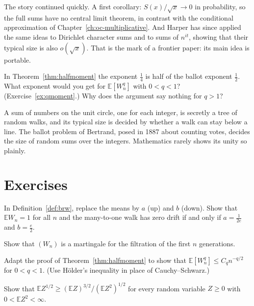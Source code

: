 The story continued quickly. A first corollary: $S(x)/\sqrt x\to0$ in probability, so the full sums have no central limit theorem, in contrast with the conditional approximation of Chapter~\ref{ch:oc-multiplicative}. And Harper has since applied the same ideas to Dirichlet character sums and to sums of $n^{it}$, showing that their typical size is also $o(\sqrt x)$. That is the mark of a frontier paper: its main idea is portable.

\begin{think}
In Theorem~\ref{thm:halfmoment} the exponent $\frac14$ is half of the ballot exponent $\frac12$. What exponent would you get for $\mathbb E[W_n^q]$ with $0<q<1$? (Exercise~\ref{ex:qmoment}.) Why does the argument say nothing for $q>1$?
\end{think}

\begin{beauty}
A sum of numbers on the unit circle, one for each integer, is secretly a tree of random walks, and its typical size is decided by whether a walk can stay below a line. The ballot problem of Bertrand, posed in 1887 about counting votes, decides the size of random sums over the integers. Mathematics rarely shows its unity so plainly.
\end{beauty}

\section{Exercises}

\begin{exercise}[$\star$]\label{ex:criticalparams}
In Definition~\ref{def:brw}, replace the means by $a$ (up) and $b$ (down). Show that $\mathbb EW_n=1$ for all $n$ and the many-to-one walk has zero drift if and only if $a=\frac1{2e}$ and $b=\frac e2$.
\end{exercise}

\begin{exercise}[$\star$]\label{ex:martingale}
Show that $(W_n)$ is a martingale for the filtration of the first $n$ generations.
\end{exercise}

\begin{exercise}[$\star\star$]\label{ex:qmoment}
Adapt the proof of Theorem~\ref{thm:halfmoment} to show that $\mathbb E[W_n^q]\le C_qn^{-q/2}$ for $0<q<1$. (Use Hölder's inequality in place of Cauchy--Schwarz.)
\end{exercise}

\begin{exercise}[$\star\star$]\label{ex:holderlower}
Show that $\mathbb EZ^{1/2}\ge(\mathbb EZ)^{3/2}/(\mathbb EZ^2)^{1/2}$ for every random variable $Z\ge0$ with $0<\mathbb EZ^2<\infty$.
\end{exercise}

